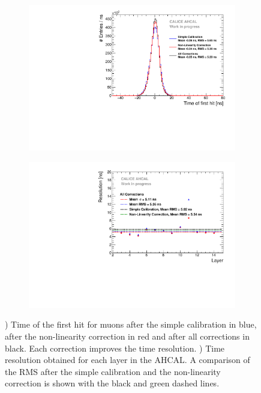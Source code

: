 \begin{figure}[htbp!]
	\begin{subfigure}[t]{0.5\textwidth}
		\centering
		\includegraphics[width=1\textwidth]{../Thesis_Plots/Timing/Muons/Plots/Timing_AHCAL_AllCorrection.pdf}
		\caption{}\label{fig:timing_muons}
	\end{subfigure}
	\hfill
	\begin{subfigure}[t]{0.5\textwidth}
		\centering
		\includegraphics[width=1\textwidth]{../Thesis_Plots/Timing/Muons/Plots/ResolutionPerModule_AllCorrection.pdf}
		\caption{}\label{fig:timing_reso_all_muons}
	\end{subfigure}
	\caption{) Time of the first hit for muons after the simple calibration in blue, after the non-linearity correction in red and after all corrections in black. Each correction improves the time resolution. ) Time resolution obtained for each layer in the AHCAL. A comparison of the RMS after the simple calibration and the non-linearity correction is shown with the black and green dashed lines.}
\end{figure}

